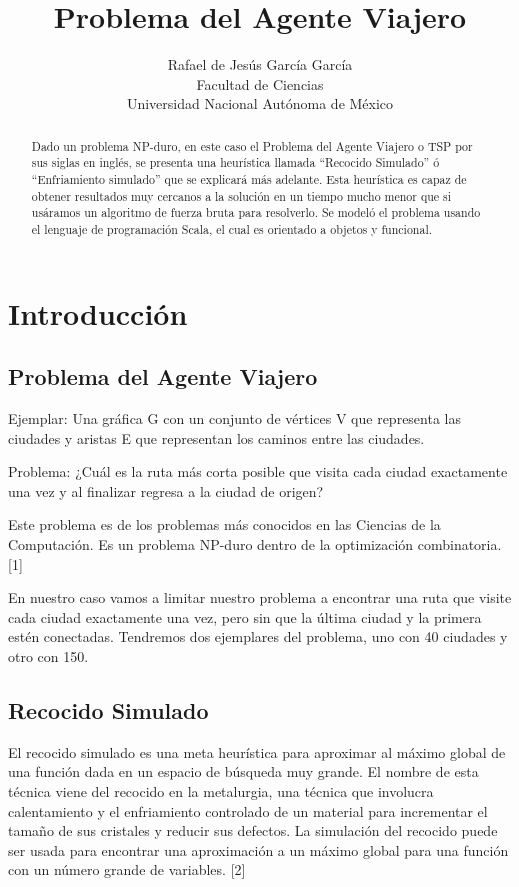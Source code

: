 \documentclass[12px]{article}
\title{Problema del Agente Viajero}
\author{Rafael de Jesús García García\\
Facultad de Ciencias\\
Universidad Nacional Autónoma de México}
\begin{document}
\maketitle

\begin{abstract}
Dado un problema NP-duro, en este caso el Problema del Agente Viajero o TSP por sus siglas en inglés, se presenta una heurística llamada ``Recocido Simulado'' ó ``Enfriamiento simulado'' que se explicará más adelante. Esta heurística es capaz de obtener resultados muy cercanos a la solución en un tiempo mucho menor que si usáramos un algoritmo de fuerza bruta para resolverlo. Se modeló el problema usando el lenguaje de programación Scala, el cual es orientado a objetos y funcional.
\end{abstract}

\section{Introducción}
\subsection{Problema del Agente Viajero}

Ejemplar: Una gráfica G con un conjunto de vértices V que representa las ciudades y aristas E que representan los caminos entre las ciudades.\\ \par
Problema: ¿Cuál es la ruta más corta posible que visita cada ciudad exactamente una vez y al finalizar regresa a la ciudad de origen?\\ \par
Este problema es de los problemas más conocidos en las Ciencias de la Computación. Es un problema NP-duro dentro de la optimización combinatoria. [1] \\ \par
En nuestro caso vamos a limitar nuestro problema a encontrar una ruta que visite cada ciudad exactamente una vez, pero sin que la última ciudad y la primera estén conectadas. Tendremos dos ejemplares del problema, uno con 40 ciudades y otro con 150.

\subsection{Recocido Simulado}
El recocido simulado es una meta heurística para aproximar al máximo global de una función dada en un espacio de búsqueda muy grande. El nombre de esta técnica viene del recocido en la metalurgia, una técnica que involucra calentamiento y el enfriamiento controlado de un material para incrementar el tamaño de sus cristales y reducir sus defectos. La simulación del recocido puede ser usada para encontrar una aproximación a un máximo global para una función con un número grande de variables. [2]
\end{document}
